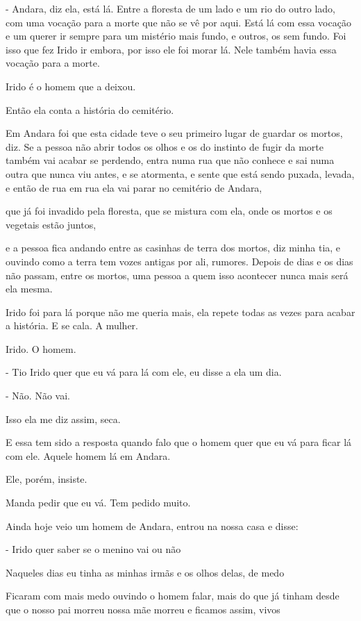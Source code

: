 - Andara, diz ela, está lá. Entre a floresta de um lado e um rio do
outro lado, com uma vocação para a morte que não se vê por aqui. Está lá
com essa vocação e um querer ir sempre para um mistério mais fundo, e
outros, os sem fundo. Foi isso que fez Irido ir embora, por isso ele foi
morar lá. Nele também havia essa vocação para a morte.

Irido é o homem que a deixou.

Então ela conta a história do cemitério.

Em Andara foi que esta cidade teve o seu primeiro lugar de guardar os
mortos, diz. Se a pessoa não abrir todos os olhos e os do instinto de
fugir da morte também vai acabar se perdendo, entra numa rua que não
conhece e sai numa outra que nunca viu antes, e se atormenta, e sente
que está sendo puxada, levada, e então de rua em rua ela vai parar no
cemitério de Andara,

que já foi invadido pela floresta, que se mistura com ela, onde os
mortos e os vegetais estão juntos,

e a pessoa fica andando entre as casinhas de terra dos mortos, diz minha
tia, e ouvindo como a terra tem vozes antigas por ali, rumores. Depois
de dias e os dias não passam, entre os mortos, uma pessoa a quem isso
acontecer nunca mais será ela mesma.

Irido foi para lá porque não me queria mais, ela repete todas as vezes
para acabar a história. E se cala. A mulher.

Irido. O homem.

- Tio Irido quer que eu vá para lá com ele, eu disse a ela um dia.

- Não. Não vai.

Isso ela me diz assim, seca.

E essa tem sido a resposta quando falo que o homem quer que eu vá para
ficar lá com ele. Aquele homem lá em Andara.

Ele, porém, insiste.

Manda pedir que eu vá. Tem pedido muito.

Ainda hoje veio um homem de Andara, entrou na nossa casa e disse:

- Irido quer saber se o menino vai ou não

Naqueles dias eu tinha as minhas irmãs e os olhos delas, de medo

Ficaram com mais medo ouvindo o homem falar, mais do que já tinham desde
que o nosso pai morreu nossa mãe morreu e ficamos assim, vivos

